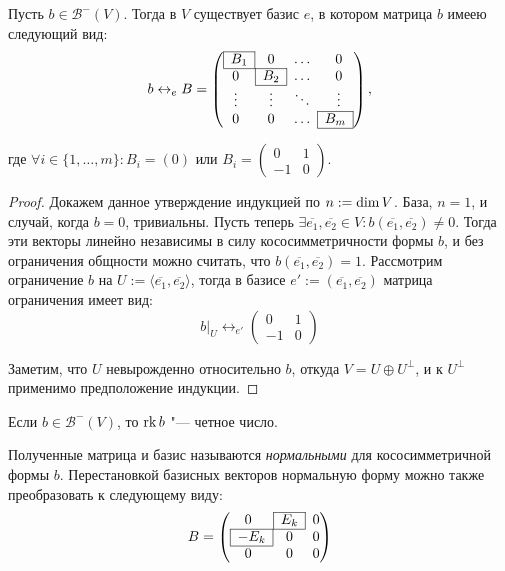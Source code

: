 \begin{theorem}
	Пусть $b \in \mathcal{B}^-(V)$. Тогда в $V$ существует базис $e$, в котором матрица $b$ имеею следующий вид:
	\[b \leftrightarrow_e B = \left(\begin{array}{@{}cccc@{}}
		\cline{1-1}
		\multicolumn{1}{|c|}{B_1} & 0 & \dots & 0\\
		\cline{1-2}
		0 & \multicolumn{1}{|c|}{B_2} & \dots & 0\\
		\cline{2-2}
		\vdots & \vdots & \ddots & \vdots\\
		\cline{4-4}
		0 & 0 & \dots & \multicolumn{1}{|c|}{B_m}\\
		\cline{4-4}
	\end{array}\right),\]
	
	где $\forall i \in \{1, \dots, m\}: B_i = (0)$ или $B_i = \begin{pmatrix}0&1\\
		-1&0\end{pmatrix}$.
\end{theorem}

\begin{proof}
	Докажем данное утверждение индукцией по $n \hm{:=} \dim{V}$. База, $n = 1$, и случай, когда $b = 0$, тривиальны. Пусть теперь $\exists \overline{e_1}, \overline{e_2} \in V: b(\overline{e_1}, \overline{e_2}) \ne 0$. Тогда эти векторы линейно независимы в силу кососимметричности формы $b$, и без ограничения общности можно считать, что $b(\overline{e_1}, \overline{e_2}) = 1$. Рассмотрим ограничение $b$ на $U := \langle\overline{e_1}, \overline{e_2}\rangle$, тогда в базисе $e' := (\overline{e_1}, \overline{e_2})$ матрица ограничения имеет вид:
	\[b|_U \leftrightarrow_{e'} \begin{pmatrix}0&1\\-1&0\end{pmatrix}\]
	
	Заметим, что $U$ невырожденно относительно $b$, откуда $V = U \oplus U^{\perp}$, и к $U^\perp$ применимо предположение индукции.
\end{proof}

\begin{corollary}
	Если $b \in \mathcal{B}^-(V)$, то $\operatorname{rk}{b}$ "--- четное число.
\end{corollary}

\begin{note}
	Полученные матрица и базис называются \textit{нормальными} для кососимметричной формы $b$. Перестановкой базисных векторов нормальную форму можно также преобразовать к следующему виду:
	\[B = \left(\begin{array}{@{}ccc@{}}
		\cline{2-2}
		0 & \multicolumn{1}{|c|}{E_k} & 0\\
		\cline{1-2}
		\multicolumn{1}{|c|}{-E_k} & 0 & 0\\
		\cline{1-1}
		0 & 0 & 0\\
	\end{array}\right)\]
\end{note}